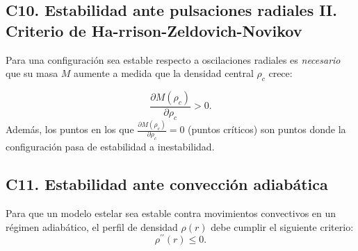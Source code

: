 \subsection*{C10. Estabilidad ante pulsaciones radiales II. Criterio de Ha-rrison-Zeldovich-Novikov}
Para una configuración sea estable respecto a oscilaciones radiales es \emph{necesario} que su masa $M$ aumente a medida que la densidad central $\rho_{c}$ crece: 

\begin{equation}
    \frac { \partial M \left( \rho _ { c } \right) } { \partial \rho _ { c } } > 0.
\end{equation}
Además, los puntos en los que $\frac { \partial M \left( \rho _ { c } \right) } { \partial \rho _ { c } } = 0$ (puntos críticos) son puntos donde la configuración pasa de estabilidad a inestabilidad.



\subsection*{C11. Estabilidad ante convección adiabática}

Para que un modelo estelar sea estable contra movimientos convectivos en un régimen adiabático, el perfil de densidad $\rho(r)$ debe cumplir el siguiente criterio: 
\begin{equation}
    \rho ^ { \prime \prime } ( r ) \leq 0.
\end{equation}
